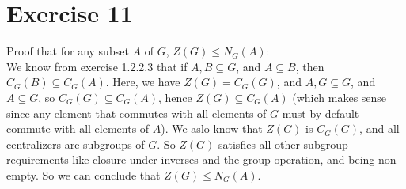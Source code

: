 \documentclass[12pt]{article}
\begin{document}
    \section*{Exercise 11}
    Proof that for any subset $A$ of $G$, $Z(G) \leqslant N_G(A)$: \\
    We know from exercise 1.2.2.3 that if $A, B \subseteq G$,
    and $A \subseteq B$, then $C_G(B) \subseteq C_G(A)$.
    Here, we have $Z(G) = C_G(G)$,
    and $A, G \subseteq G$,
    and $A \subseteq G$, 
    so $C_G(G) \subseteq C_G(A)$,
    hence $Z(G) \subseteq C_G(A)$
    (which makes sense since any element that commutes with all elements of
    $G$ must by default commute with all elements of $A$). 
    We aslo know that $Z(G)$ is $C_G(G)$, and all centralizers
    are subgroups of $G$.
    So $Z(G)$ satisfies all other subgroup requirements
    like closure under inverses and the group operation, 
    and being non-empty.
    So we can conclude that $Z(G) \leqslant N_G(A)$.
\end{document}
